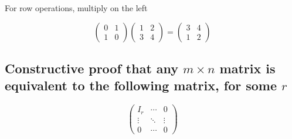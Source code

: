\documentclass[a4paper]{article}
\begin{document}
For row operations, multiply on the left

\begin{ex}
\[ \begin{pmatrix}
0 & 1 \\
1 & 0
\end{pmatrix} \begin{pmatrix}
1 & 2\\
3 & 4
\end{pmatrix} = \begin{pmatrix}
3 & 4\\
1 & 2
\end{pmatrix} \]	
\end{ex}

\subsection{Constructive proof that any $ m \times n $ matrix is equivalent to the following matrix, for some $ r $ }
 
\[ \begin{pmatrix}
I_{r} & \cdots & 0 \\
\vdots & \ddots & \vdots \\
0 & \cdots & 0  \end{pmatrix} \]
\end{document}
